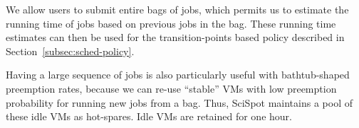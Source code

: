 We allow users to submit entire bags of jobs, which permits us to estimate the running time of jobs based on previous jobs in the bag.
These running time estimates can then be used for the transition-points based policy described in Section~\ref{subsec:sched-policy}. 

Having a large sequence of jobs is also particularly useful with bathtub-shaped preemption rates, because we can re-use ``stable'' VMs with low preemption probability for running new jobs from a bag.
Thus, SciSpot maintains a pool of these idle VMs as hot-spares. 
Idle VMs are retained for one hour. 


